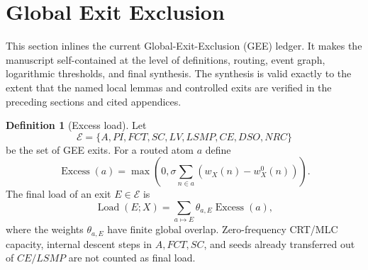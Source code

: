 \documentclass[11pt]{article}
\theoremstyle{definition}
\newtheorem{definition}[theorem]{Definition}
\begin{document}
\section{Global Exit Exclusion}\label{sec:gee}
This section inlines the current Global-Exit-Exclusion (GEE) ledger.  It makes the manuscript self-contained at the level of definitions, routing, event graph, logarithmic thresholds, and final synthesis.  The synthesis is valid exactly to the extent that the named local lemmas and controlled exits are verified in the preceding sections and cited appendices.

\begin{definition}[Excess load]\label{def:gee-load}
Let
\[
  \mathcal E=\{A,PI,FCT,SC,LV,LSMP,CE,DSO,NRC\}
\]
be the set of GEE exits.  For a routed atom $a$ define
\[
  \operatorname{Excess}(a)=\max\left(0,\sigma\sum_{n\in a}(w_X(n)-w_X^0(n))\right).
\]
The final load of an exit $E\in\mathcal E$ is
\[
  \operatorname{Load}(E;X)=\sum_{a\mapsto E}\theta_{a,E}\operatorname{Excess}(a),
\]
where the weights $\theta_{a,E}$ have finite global overlap.  Zero-frequency CRT/MLC capacity, internal descent steps in $A,FCT,SC$, and seeds already transferred out of $CE/LSMP$ are not counted as final load.
\end{definition}
\end{document}
